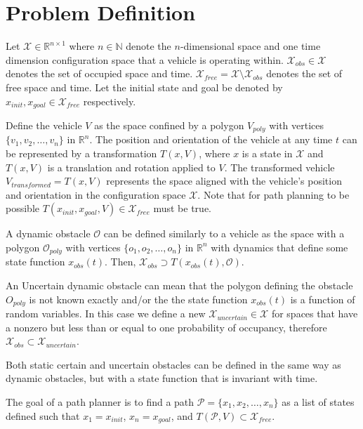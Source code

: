 \documentclass{aiaa-tc}
\begin{document}
\section{Problem Definition}
Let \(\mathcal{X} \in \mathbb{R}^{n \times 1}\) where  \( n \in \mathbb{N} \) denote the \(n\)-dimensional space and one time dimension configuration space that a vehicle is operating within. 
\(\mathcal{X}_{obs} \in \mathcal{X}\) denotes the set of occupied space and time. 
\(\mathcal{X}_{free} = \mathcal{X} \setminus \mathcal{X}_{obs}\) denotes the set of free space and time. 
Let the initial state and goal be denoted by \(x_{init}, x_{goal} \in \mathcal{X}_{free}\) respectively. 

Define the vehicle \(V\) as the space confined by a polygon \(V_{poly}\) with vertices \(\{v_1, v_2, \ldots, v_n\}\) in \(\mathbb{R}^n\). 
The position and orientation of the vehicle at any time \(t\) can be represented by a transformation \(T(x, V)\), 
where \(x\) is a state in \(\mathcal{X}\) and \(T(x, V)\) is a translation and rotation applied to \(V\). 
The transformed vehicle \(V_{transformed} = T(x, V)\) represents the space aligned with the vehicle's position and orientation in the 
configuration space \(\mathcal{X}\). Note that for path planning to be possible \(T({x_{init}, x_{goal}},V) \in \mathcal{X}_{free}\) must be true.

A dynamic obstacle \(\mathcal{O}\) can be defined similarly to a vehicle as the space with a polygon \(\mathcal{O}_{poly}\) with vertices \(\{o_1, o_2, \ldots, o_n\}\) 
in \(\mathbb{R}^n\) with dynamics that define some state function \(x_{obs}(t)\). 
Then, \(\mathcal{X}_{obs} \supset T(x_{obs}(t), \mathcal{O})\). 

An Uncertain dynamic obstacle can mean that the polygon defining the obstacle \(O_{poly}\) is not known exactly and/or the
the state function \(x_{obs}(t)\) is a function of random variables. In this case we define a new \(\mathcal{X}_{uncertain} \in \mathcal{X}\) 
for spaces that have a nonzero but less than or equal 
to one probability of occupancy, therefore \(\mathcal{X}_{obs} \subset \mathcal{X}_{uncertain}\).

Both static certain and uncertain obstacles can be defined in the same way as dynamic obstacles, but with a state function that is invariant with time.

The goal of a path planner is to find a path \(\mathcal{P} = \{x_1, x_2, \ldots, x_n\}\) as a list of states defined such 
that \(x_1 = x_{init}\), \(x_n = x_{goal}\), and \(T(\mathcal{P}, V) \subset \mathcal{X}_{free}\).
\end{document}

